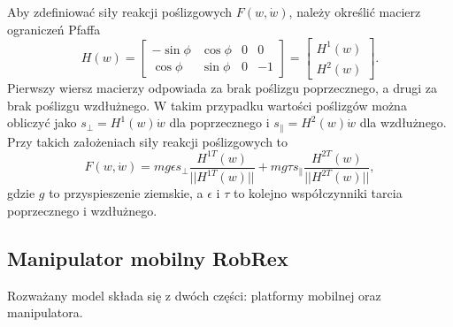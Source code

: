 Aby zdefiniować siły reakcji poślizgowych $F(w, \dot{w})$, należy określić macierz ograniczeń Pfaffa
\begin{equation}
H(w)=\begin{bmatrix}
-\sin\phi & \cos\phi & 0 & 0\\
\cos\phi & \sin\phi & 0 & -1
\end{bmatrix}=\begin{bmatrix}
H^1(w)\\
H^2(w)
\end{bmatrix}.
\end{equation}
Pierwszy wiersz macierzy odpowiada za brak poślizgu poprzecznego, a drugi za brak poślizgu wzdłużnego. W takim przypadku wartości poślizgów można obliczyć jako $s_\perp=H^1(w)\dot w$ dla poprzecznego i  $s_\parallel=H^2(w)\dot w$ dla wzdłużnego. Przy takich założeniach siły reakcji poślizgowych to \begin{equation}
F(w, \dot w)=mg\epsilon s_\perp\frac{H^{1T}(w)}{||H^{1T}(w)||} + mg\tau s_\parallel\frac{H^{2T}(w)}{||H^{2T}(w)||},
\end{equation}
gdzie $g$ to przyspieszenie ziemskie, a $\epsilon$ i $\tau$ to kolejno współczynniki tarcia poprzecznego i wzdłużnego.

\subsection{Manipulator mobilny RobRex}
\hspace{\parindent}Rozważany model składa się z dwóch części: platformy mobilnej oraz manipulatora. 
